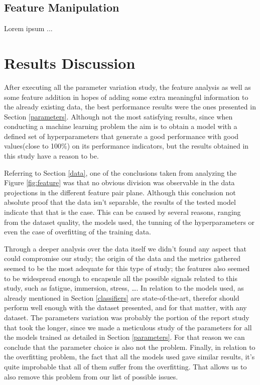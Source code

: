 \documentclass[extendedabs]{recpad2k}
\begin{document}
\subsection{Feature Manipulation}

Lorem ipsum ...


\section{Results Discussion}
After executing all the parameter variation study, the feature analysis as well as some feature addition in hopes of adding some extra meaningful information 
to the already existing data, the best performance results were the ones presented in Section \ref{parameters}.
Although not the most satisfying results, since when conducting a machine learning problem the aim is to obtain a model with a defined set of hyperparameters 
that generate a good performance with good values(close to 100\%) on its performance indicators, but the results obtained in this study have a reason to be.

Referring to Section \ref{data}, one of the conclusions taken from analyzing the Figure \ref{fig:feature} was that no obvious division was observable in the 
data projections in the different feature pair plane. Although this conclusion not absolute proof that the data isn't separable, the results of the tested 
model indicate that that is the case. This can be caused by several reasons, ranging from the dataset quality, the models used, the tunning of the 
hyperparameters or even the case of overfitting of the training data. 

Through a deeper analysis over the data itself we didn't found any aspect that could compromise our study; the origin of the data and the metrics gathered 
seemed to be the most adequate for this type of study; the features also seemed to be widespread enough to encapsule all the possible signals related to this 
study, such as fatigue, immersion, stress, \dots. In relation to the models used, as already mentioned in Section \ref{classifiers} are state-of-the-art, 
therefor should perform well enough with the dataset presented, and for that matter, with any dataset. The parameters variation was probably the portion of 
the report study that took the longer, since we made a meticulous study of the parameters for all the models trained as detailed in Section \ref{parameters}. 
For that reason we can conclude that the parameter choice is also not the problem. Finally, in relation to the overfitting problem, the fact that all the models 
used gave similar results, it's quite improbable that all of them suffer from the overfitting. That allows us to also remove this problem from our list of 
possible issues.
\end{document}
